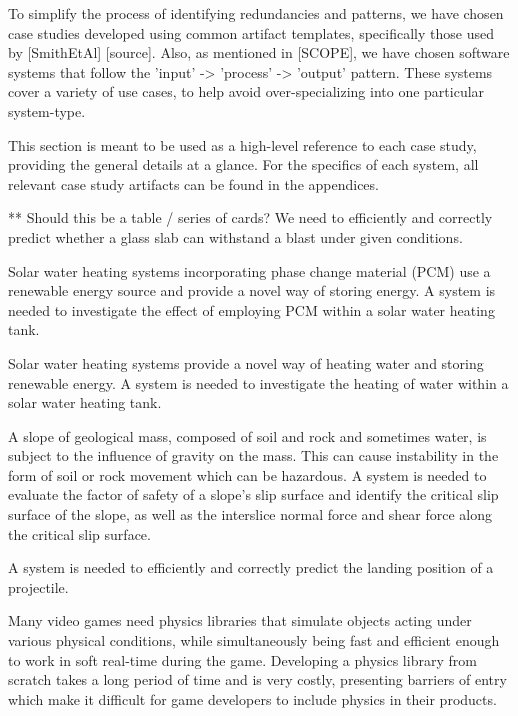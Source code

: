 To simplify the process of identifying redundancies and patterns, we have chosen
case studies developed using common artifact templates, specifically those 
used by [SmithEtAl] [source]. Also, as mentioned in [SCOPE], we have chosen
software systems that follow the 'input' -> 'process' -> 'output' pattern.
These systems cover a variety of use cases, to help avoid over-specializing into
one particular system-type. 

This section is meant to be used as a high-level reference to each case study, 
providing the general details at a glance. For the specifics of each system, 
all relevant case study artifacts can be found in the appendices.

** Should this be a table / series of cards?
{We need to efficiently and correctly predict whether a glass 
slab can withstand a blast under given conditions.}
{}

{Solar water heating systems incorporating phase change 
 material (PCM) use a renewable energy source and provide a novel way of 
 storing energy. A system is needed to investigate the effect of employing PCM
 within a solar water heating tank.}
{}

{Solar water heating systems provide a novel way of 
heating water and storing renewable energy. A system is needed to investigate
the heating of water within a solar water heating tank.}
{}

{A slope of geological mass, composed of soil and rock 
 and sometimes water, is subject to the influence of gravity on the mass. 
 This can cause instability in the form of soil or rock movement which can
 be hazardous. A system is needed to evaluate the factor of safety of 
 a slope's slip surface and identify the critical slip surface of the slope, 
 as well as the interslice normal force and shear force along the critical 
 slip surface.}
{}

{A system is needed to efficiently and correctly predict
 the landing position of a projectile.}
{}

{Many video games need physics libraries that simulate 
 objects acting under various physical conditions, while simultaneously being 
 fast and efficient enough to work in soft real-time during the game. 
 Developing a physics library from scratch takes a long period of time and is 
 very costly, presenting barriers of entry which make it difficult for game 
 developers to include physics in their products.}
{}

